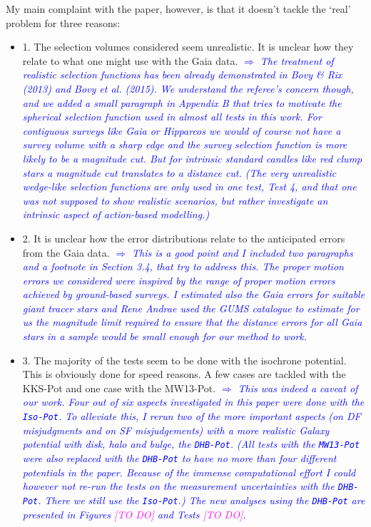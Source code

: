 \documentclass[10pt,a4paper]{article}
\newcommand{\Wilma}[1]{\textcolor{Magenta}{#1}}
\newcommand{\Comment}[1]{\textsl{\textcolor{Blue}{$\Longrightarrow$ {#1}}}}
\begin{document}
My main complaint with the paper, however, is that it doesn't tackle the `real'
problem for three reasons:
\begin{itemize}
\item 1. The selection volumes considered seem unrealistic. It is unclear how they relate to what one might use with the Gaia data. \Comment{The treatment of realistic selection functions has been already demonstrated in Bovy \& Rix (2013) and Bovy et al. (2015). We understand the referee's concern though, and we added a small paragraph in Appendix B that tries to motivate the spherical selection function used in almost all tests in this work. For contiguous surveys like Gaia or Hipparcos we would of course not have a survey volume with a sharp edge and the survey selection function is more likely to be a magnitude cut. But for intrinsic standard candles like red clump stars a magnitude cut translates to a distance cut. (The very unrealistic wedge-like selection functions are only used in one test, Test 4, and that one was not supposed to show realistic scenarios, but rather investigate an intrinsic aspect of action-based modelling.)}\\
\item 2. It is unclear how the error distributions relate to the anticipated errors from the Gaia data. \Comment{This is a good point and I included two paragraphs and a footnote in Section 3.4, that try to address this. The proper motion errors we considered were inspired by the range of proper motion errors achieved by ground-based surveys. I estimated also the Gaia errors for suitable giant tracer stars and Rene Andrae used the GUMS catalogue to estimate for us the magnitude limit required to ensure that the distance errors for all Gaia stars in a sample would be small enough for our method to work.}
\item 3. The majority of the tests seem to be done with the isochrone potential. This is obviously done for speed reasons. A few cases are tackled with the KKS-Pot and one case with the MW13-Pot. \Comment{This was indeed a caveat of our work. Four out of six aspects investigated in this paper were done with the \texttt{Iso-Pot}. To alleviate this, I rerun two of the more important aspects (on DF misjudgments and on SF misjudgements) with a more realistic Galaxy potential with disk, halo and bulge, the \texttt{DHB-Pot}. (All tests with the \texttt{MW13-Pot} were also replaced with the \texttt{DHB-Pot} to have no more than four different potentials in the paper. Because of the immense computational effort I could however not re-run the tests on the measurement uncertainties with the \texttt{DHB-Pot}. There we still use the \texttt{Iso-Pot}.) The new analyses using the \texttt{DHB-Pot} are presented in Figures \Wilma{[TO DO]} and Tests \Wilma{[TO DO]}.} \\

\end{itemize}
\end{document}
